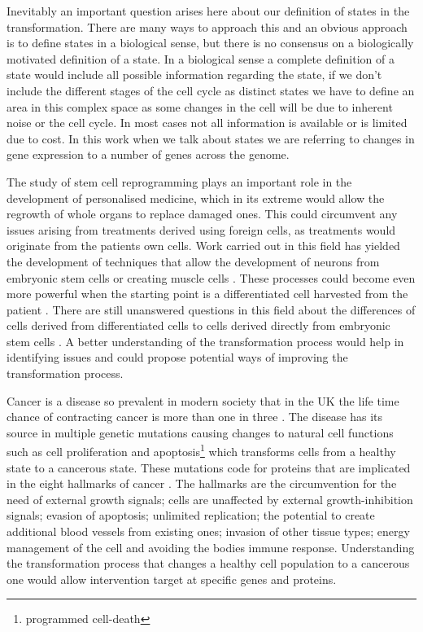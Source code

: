 Inevitably an important question arises here about our definition of states in the transformation. There are many ways to approach this and an obvious approach is to define states in a biological sense, but there is no consensus on a biologically motivated definition of a state. In a biological sense a complete definition of a state would include all possible information regarding the state, if we don't include the different stages of the cell cycle as distinct states we have to define an area in this complex space as some changes in the cell will be due to inherent noise or the cell cycle. In most cases not all information is available or is limited due to cost. In this work when we talk about states we are referring to changes in gene expression to a number of genes across the genome.

The study of stem cell reprogramming plays an important role in the development of personalised medicine, which in its extreme would allow the regrowth of whole organs to replace damaged ones. This could circumvent any issues arising from treatments derived using foreign cells, as treatments would originate from the patients own cells. Work carried out in this field has yielded the development of techniques that allow the development of neurons from embryonic stem cells \citep{Vierbuchen:2010fa, Pang:2011ce} or creating muscle cells \citep{Ieda:2010ir, Efe:2011bpa}. These processes could become even more powerful when the starting point is a differentiated cell harvested from the patient \citep{Takahashi:2006hi}. There are still unanswered questions in this field about the differences of cells derived from differentiated cells to cells derived directly from embryonic stem cells \citep{Carey:2011bs, Bock:2011kx}. A better understanding of the transformation process would help in identifying issues and could propose potential ways of improving the transformation process.

Cancer is a disease so prevalent in modern society that in the UK the life time chance of contracting cancer is more than one in three \citep{Sasieni:2011}. The disease has its source in multiple genetic mutations causing changes to natural cell functions such as cell proliferation and apoptosis\footnote{programmed cell-death} which transforms cells from a healthy state to a cancerous state. These mutations code for proteins that are implicated in the eight hallmarks of cancer \citep{Hanahan:2011gu}. The hallmarks are the circumvention for the need of external growth signals; cells are unaffected by external growth-inhibition signals; evasion of apoptosis; unlimited replication; the potential to create additional blood vessels from existing ones; invasion of other tissue types; energy management of the cell and avoiding the bodies immune response. Understanding the transformation process that changes a healthy cell population to a cancerous one would allow intervention target at specific genes and proteins.

